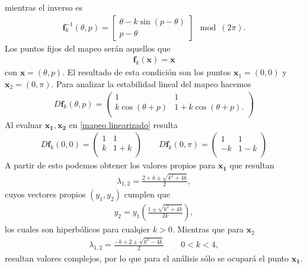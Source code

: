 mientras el inverso es
\begin{eqnarray}
\mathbf{f}_{k}^{-1}(\theta,p) = \left[\begin{array}{c}
\theta  -k\sin(p-\theta) \\
p -\theta
\end{array}\right] \mod(2\pi). \label{mapeo estandar inverso}
\end{eqnarray}
Los puntos fijos del mapeo serán aquellos que 
\begin{eqnarray}
\mathbf{f}_{k}(\mathbf{x})=\mathbf{x} \label{ec puntos fijos}
\end{eqnarray}
con $\mathbf{x}=(\theta,p)$. El resultado de esta condición son los puntos $\mathbf{x}_{1}=(0,0)$ y $\mathbf{x}_{2}=(0,\pi)$. Para analizar la estabilidad lineal del mapeo hacemos
\begin{eqnarray}
D\mathbf{f}_{k}(\theta,p)=\begin{pmatrix}
1 & 1 \\
k\cos(\theta+p)& 1+k\cos(\theta+p).\\ 
\end{pmatrix}\label{mapeo linearizado}
\end{eqnarray}
Al evaluar $\mathbf{x_{1}},\mathbf{x_{2}}$ en \ref{mapeo linearizado} resulta 
\begin{eqnarray}
D\mathbf{f}_{k}(0,0)=
\begin{pmatrix}
1 & 1\\
k & 1+k\\
\end{pmatrix} \qquad D\mathbf{f}_{k}(0,\pi)= \begin{pmatrix}
1 & 1\\
-k & 1-k\\
\end{pmatrix}
\end{eqnarray}
A partir de esto podemos obtener los valores propios para $\mathbf{x_{1}}$ que resultan
\begin{eqnarray}
\lambda_{1,2}=\frac{2+k\pm \sqrt{k^{2}+4k}}{2},
\end{eqnarray}
cuyos vectores propios $(y_{1},y_{2})$ cumplen que
\begin{eqnarray}
y_{2}=y_{1}\left(\frac{1\pm\sqrt{k^{2}+4k}}{2k}\right),
\label{vectores propios}
\end{eqnarray}
los cuales son hiperbólicos para cualqier $k>0$. Mientras que para $\mathbf{x}_{2}$ 
\begin{eqnarray}
\lambda_{1,2}=\frac{-k+2 \pm \sqrt{k^{2}-4k}}{2} \qquad 0<k<4,
\end{eqnarray}
resultan valores complejos, por lo que para el análisis sólo se ocupará el punto $\mathbf{x_{1}}$.\\

